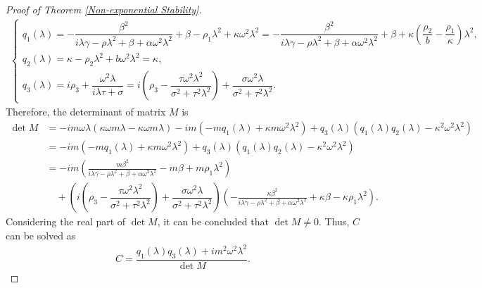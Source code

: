 \documentclass[11pt,reqno]{article}
\begin{document}
\begin{proof}[Proof of Theorem \ref{Non-exponential Stability}]
  	\begin{align}
  		\begin{cases}
  			q_1(\lambda) = -\dfrac{\beta^2}{i \lambda \gamma - \rho \lambda^2 + \beta + \alpha \omega^2 \lambda^2} + \beta - \rho_1 \lambda^2 + \kappa \omega^2 \lambda^2 = -\dfrac{\beta^2}{i \lambda \gamma - \rho \lambda^2 + \beta + \alpha \omega^2 \lambda^2} + \beta + \kappa\left(\dfrac{\rho_2}{b}-\dfrac{\rho_1}{\kappa}\right) \lambda^2,\\
  			q_2(\lambda) = \kappa - \rho_2 \lambda^2 + b \omega^2 \lambda^2 = \kappa,\\
  			q_3(\lambda) = i \rho_3 + \dfrac{\omega^2 \lambda}{i \lambda \tau + \sigma} = i\left(\rho_3 - \dfrac{\tau \omega ^2 \lambda^2}{\sigma^2 + \tau^2 \lambda^2}\right) + \dfrac{\sigma \omega^2 \lambda}{\sigma^2 + \tau^2 \lambda^2}.
  		\end{cases}
  	\end{align}
  	Therefore, the determinant of matrix $M$ is
  	\begin{align*}
  		\det M &= -im\omega\lambda \left( \kappa\omega m\lambda - \kappa\omega m\lambda \right) - im(-mq_1(\lambda)+\kappa m\omega^2\lambda^2)  + q_3(\lambda)(q_1(\lambda) q_2(\lambda) - \kappa^2 \omega^2\lambda^2) \\
  		&= - im(-mq_1(\lambda)+\kappa m\omega^2\lambda^2)  + q_3(\lambda)(q_1(\lambda) q_2(\lambda) - \kappa^2 \omega^2\lambda^2) \\
  		&= -im\left( \frac{m\beta^2}{i\lambda \gamma-\rho\lambda^2+\beta+\alpha\omega^2\lambda^2}  - m\beta + m \rho_1 \lambda^2\right) \\
  		&\quad + \left(i\left(\rho_3 - \dfrac{\tau \omega ^2 \lambda^2}{\sigma^2 + \tau^2 \lambda^2}\right) + \dfrac{\sigma \omega^2 \lambda}{\sigma^2 + \tau^2 \lambda^2}\right)\left( -\frac{\kappa\beta^2}{i\lambda \gamma-\rho\lambda^2+\beta+\alpha \omega^2\lambda^2}+\kappa\beta-\kappa\rho_1 \lambda^2\right).
  	\end{align*}
  	Considering the real part of $\det M$, it can be concluded that $\det M \neq 0$.
  	Thus, $C$ can be solved as
  	\begin{align}\label{C}
  		C = \dfrac{q_1(\lambda)q_3(\lambda) + im^2 \omega^2 \lambda^2}{\det M}.
  	\end{align}

\end{proof}
\end{document}
